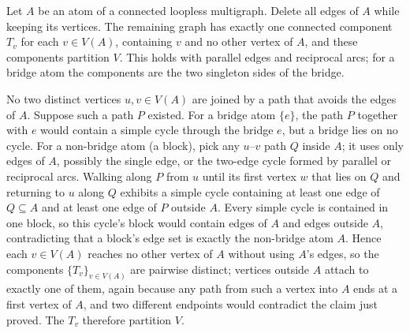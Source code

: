 \begin{lemma}\label{lem:atomcomponents}
Let $A$ be an atom of a connected loopless multigraph. Delete all
edges of $A$ while keeping its vertices. The remaining graph has
exactly one connected component $T_v$ for each $v\in V(A)$, containing
$v$ and no other vertex of $A$, and these components partition $V$.
This holds with parallel edges and reciprocal arcs; for a bridge atom
the components are the two singleton sides of the bridge.
\end{lemma}
\begin{pf}
No two distinct vertices $u,v\in V(A)$ are joined by a path that
avoids the edges of $A$. Suppose such a path $P$ existed. For a bridge
atom $\{e\}$, the path $P$ together with $e$ would contain a simple
cycle through the bridge $e$, but a bridge lies on no cycle. For a
non-bridge atom (a block), pick any $u$--$v$ path $Q$ inside $A$; it
uses only edges of $A$, possibly the single edge, or the two-edge
cycle formed by parallel or reciprocal arcs. Walking along $P$ from $u$ until
its first vertex $w$ that lies on $Q$ and returning to $u$ along $Q$
exhibits a simple cycle containing at least one edge of $Q\subseteq A$
and at least one edge of $P$ outside $A$. Every simple cycle is
contained in one block, so this cycle's block would contain edges of
$A$ and edges outside $A$, contradicting that a block's edge set is
exactly the non-bridge atom $A$. Hence each $v\in V(A)$ reaches no
other vertex of $A$ without using $A$'s edges, so the components
$\{T_v\}_{v\in V(A)}$ are pairwise distinct; vertices outside $A$
attach to exactly one of them, again because any path from such a
vertex into $A$ ends at a first vertex of $A$, and two different
endpoints would contradict the claim just proved. The $T_v$ therefore
partition $V$.
\end{pf}

